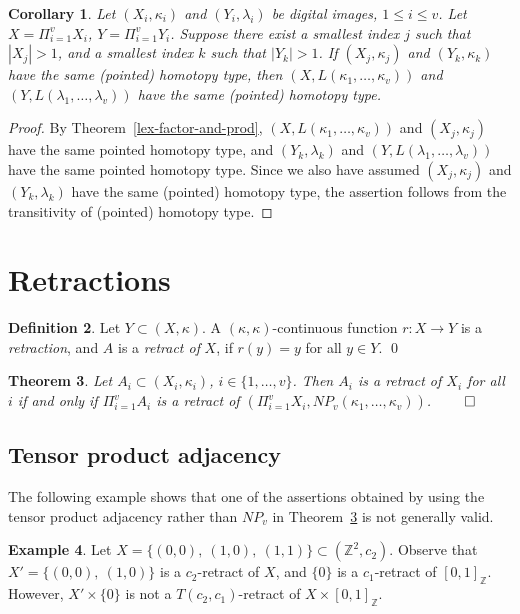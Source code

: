 \documentclass{article}
\theoremstyle{plain}
\newtheorem{thm}{Theorem}
\newtheorem{cor}[thm]{Corollary}
\theoremstyle{definition}
\newtheorem{definition}[thm]{Definition}
\newtheorem{exl}[thm]{Example}
\numberwithin{thm}{section}
\def\Z{{\mathbb Z}}
\begin{document}
\begin{cor}
Let $(X_i,\kappa_i)$ and
$(Y_i, \lambda_i)$ be digital
images, $1 \leq i \le v$. Let
$X = \Pi_{i=1}^v X_i$,
$Y = \Pi_{i=1}^v Y_i$.
Suppose there exist a smallest index $j$ such that $|X_j|>1$, and
a smallest index
$k$ such that $|Y_k|>1$. If
$(X_j, \kappa_j)$ and
$(Y_k, \kappa_k)$ have the same
(pointed) homotopy type, then
$(X, L(\kappa_1,\ldots,\kappa_v))$ and
$(Y, L(\lambda_1,\ldots,\lambda_v))$ have the same (pointed) homotopy type.
\end{cor}

\begin{proof}
By Theorem~\ref{lex-factor-and-prod},
$(X, L(\kappa_1,\ldots,\kappa_v))$ and 
$(X_j,\kappa_j)$ have the same pointed homotopy type, and
$(Y_k,\lambda_k)$ and $(Y,L(\lambda_1,\ldots,\lambda_v))$ have the same pointed homotopy type. Since we also have
assumed $(X_j,\kappa_j)$ and $(Y_k,\lambda_k)$ have the same (pointed) homotopy type, the
assertion follows from the
transitivity of (pointed) homotopy type.
\end{proof}

\section{Retractions}
\begin{definition}
\rm{\cite{Borsuk,Boxer94}}
\label{retract-def}
Let $Y \subset (X,\kappa)$. A $(\kappa,\kappa)$-continuous
function $r: X \to Y$ is a {\em retraction}, and 
$A$ is a {\em retract of} $X$, if $r(y)=y$ for all
$y \in Y$. \qed
\end{definition}

\begin{thm}
\label{ret-thm}
\rm{\cite{BoxSta16}}
Let $A_i \subset (X_i,\kappa_i)$, $i \in \{1, \ldots, v\}$. Then
$A_i$ is a retract of $X_i$ for all $i$ if and only if
$\Pi_{i=1}^v A_i$ is a retract of 
$(\Pi_{i=1}^v X_i, NP_v(\kappa_1, \ldots, \kappa_v))$.
$\qed$
\end{thm}

\subsection{Tensor product adjacency}
The following example shows that one of the
assertions obtained by using the tensor product
adjacency rather than $NP_v$ in Theorem~\ref{ret-thm} is not generally valid.

\begin{exl}
Let $X=\{(0,0),~(1,0),~(1,1)\}
\subset (\Z^2,c_2)$. Observe that
$X'=\{(0,0),~(1,0)\}$ is a
$c_2$-retract of $X$, and
$\{0\}$ is a $c_1$-retract of
$[0,1]_{\Z}$. However,
$X' \times \{0\}$ is not a
$T(c_2,c_1)$-retract of
$X \times [0,1]_{\Z}$.
\end{exl}
\end{document}

